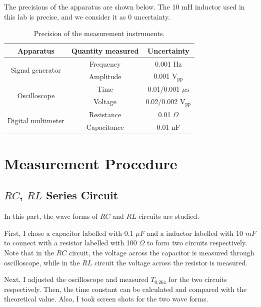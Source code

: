 \documentclass{article}
\begin{document}
The precisions of the apparatus are shown below. The 10 mH inductor used in this lab is precise, and we consider it as 0 uncertainty.

\begin{table}[H]
    \centering
    \begin{tabular}{ccc}
        \toprule
        Apparatus                           & Quantity measured & Uncertainty               \\
        \midrule
        \multirow{2}{*}{Signal generator}   & Frequency         & 0.001 Hz                          \\
                                            & Amplitude         & 0.001 $\text{V}_{\text{pp}}$      \\ \hline
        \multirow{2}{*}{Oscilloscope}       & Time & 0.01/0.001 $\mu\text{s}$          \\
                                            & Voltage           & 0.02/0.002 $\text{V}_{\text{pp}}$ \\ \hline
        \multirow{2}{*}{Digital multimeter} & Resistance        & 0.01 $\Omega$                     \\
                                            & Capacitance       & 0.01 nF                       \\
        \bottomrule
    \end{tabular}
    \caption{Precision of the measurement instruments.}\label{tablePresicion}
\end{table}

\newpage

\section{Measurement Procedure}

\subsection{$RC$, $RL$ Series Circuit}
In this part, the wave forms of $RC$ and $RL$ circuits are studied.

First, I chose a capacitor labelled with 0.1 $\mu F$ and a inductor labelled with 10 $mF$ to connect with a resistor labelled with 100 $\Omega$ to form two circuits respectively. Note that in the $RC$ circuit, the voltage across the capacitor is measured through oscilloscope, while in the $RL$ circuit the voltage across the resistor is measured.

Next, I adjusted the oscilloscope and measured $T_{0.264}$ for the two circuits respectively. Then, the time constant can be calculated and compared with the theoretical value. Also, I took screen shots for the two wave forms.
\end{document}
